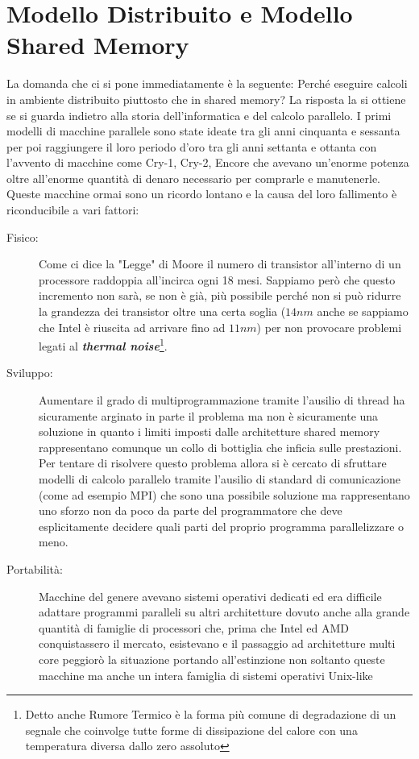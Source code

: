 \section{Modello Distribuito e Modello Shared Memory}
La domanda che ci si pone immediatamente è la seguente: Perché eseguire calcoli in ambiente distribuito piuttosto che in shared memory? La risposta la si ottiene se si guarda indietro alla storia dell'informatica e del calcolo parallelo. I primi modelli di macchine parallele sono state ideate tra gli anni cinquanta e sessanta per poi raggiungere il loro periodo d'oro tra gli anni settanta e ottanta con l'avvento di macchine come Cry-1, Cry-2, Encore che avevano un'enorme potenza oltre all'enorme quantità di denaro necessario per comprarle e manutenerle. Queste macchine ormai sono un ricordo lontano e la causa del loro fallimento è riconducibile a vari fattori:
\begin{description}
    \item [Fisico:] Come ci dice la "Legge" di Moore il numero di transistor all'interno di un processore raddoppia all'incirca ogni 18 mesi. Sappiamo però che questo incremento non sarà, se non è già, più possibile perché non si può ridurre la grandezza dei transistor oltre una certa soglia ($14nm$ anche se sappiamo che Intel è riuscita ad arrivare fino ad $11nm$) per non provocare problemi legati al \textbf{\textit{thermal noise}}\footnote{Detto anche Rumore Termico è la forma più comune di degradazione di un segnale che coinvolge tutte forme di dissipazione del calore con una temperatura diversa dallo zero assoluto}. 
    \item [Sviluppo:] Aumentare il grado di multiprogrammazione tramite l'ausilio di thread ha sicuramente arginato in parte il problema ma non è sicuramente una soluzione in quanto i limiti imposti dalle architetture shared memory rappresentano comunque un collo di bottiglia che inficia sulle prestazioni. Per tentare di risolvere questo problema allora si è cercato di sfruttare modelli di calcolo parallelo tramite l'ausilio di standard di comunicazione (come ad esempio MPI) che sono una possibile soluzione ma rappresentano uno sforzo non da poco da parte del programmatore che deve esplicitamente decidere quali parti del proprio programma parallelizzare o meno.
    \item[Portabilità:] Macchine del genere avevano sistemi operativi dedicati ed era difficile adattare programmi paralleli su altri architetture dovuto anche alla grande quantità di famiglie di processori che, prima che Intel ed AMD conquistassero il mercato, esistevano e il passaggio ad architetture multi core peggiorò la situazione portando all'estinzione non soltanto queste macchine ma anche un intera famiglia di sistemi operativi Unix-like
\end{description}